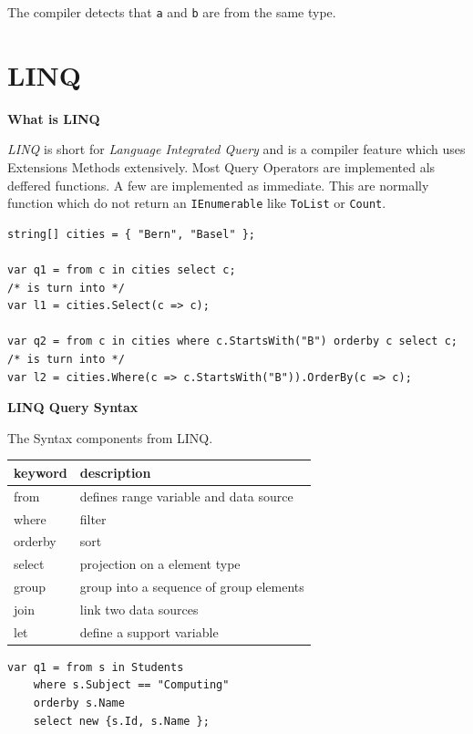 \documentclass[11pt,twoside,landscape]{article}
\begin{document}
\begin{multicols}{3}
The compiler detects that \texttt{a} and \texttt{b} are from the same type. 

\section{LINQ}
\label{sec:org86b237a}
\textbf{What is LINQ}

\emph{LINQ} is short for \emph{Language Integrated Query} and is a compiler feature which uses Extensions Methods extensively.
Most Query Operators are implemented als deffered functions.
A few are implemented as immediate.
This are normally function which do not return an \texttt{IEnumerable} like \texttt{ToList} or \texttt{Count}.


\lstset{language=csharp,label= ,caption= ,captionpos=b,numbers=none}
\begin{lstlisting}
string[] cities = { "Bern", "Basel" };

var q1 = from c in cities select c;
/* is turn into */
var l1 = cities.Select(c => c);

var q2 = from c in cities where c.StartsWith("B") orderby c select c;
/* is turn into */
var l2 = cities.Where(c => c.StartsWith("B")).OrderBy(c => c);
\end{lstlisting}

\textbf{LINQ Query Syntax}

The Syntax components from LINQ.


\begin{center}
\begin{tabular}{ll}
keyword & description\\
\hline
from & defines range variable and data source\\
where & filter\\
orderby & sort\\
select & projection on a element type\\
group & group into a sequence of group elements\\
join & link two data sources\\
let & define a support variable\\
\end{tabular}
\end{center}


\lstset{language=csharp,label= ,caption= ,captionpos=b,numbers=none}
\begin{lstlisting}
var q1 = from s in Students
    where s.Subject == "Computing"
    orderby s.Name
    select new {s.Id, s.Name };
\end{lstlisting}


\end{multicols}
\end{document}
